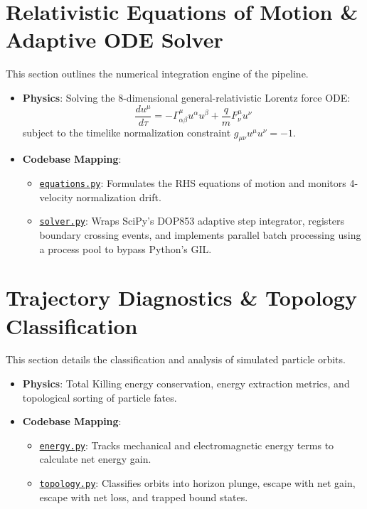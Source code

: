 \documentclass[11pt,a4paper]{article}
\begin{document}
\section{Relativistic Equations of Motion \& Adaptive ODE Solver}
This section outlines the numerical integration engine of the pipeline.
\begin{itemize}
    \item \textbf{Physics}: Solving the 8-dimensional general-relativistic Lorentz force ODE:
    \begin{equation}
        \frac{du^\mu}{d\tau} = -\Gamma^\mu_{\alpha\beta} u^\alpha u^\beta + \frac{q}{m} F^\mu_\nu u^\nu
    \end{equation}
    subject to the timelike normalization constraint $g_{\mu\nu} u^\mu u^\nu = -1$.
    \item \textbf{Codebase Mapping}:
    \begin{itemize}
        \item \href{file:///Users/vihaa/Desktop/grtp-kerr/grtp/integrator/equations.py}{\texttt{equations.py}}: Formulates the RHS equations of motion and monitors 4-velocity normalization drift.
        \item \href{file:///Users/vihaa/Desktop/grtp-kerr/grtp/integrator/solver.py}{\texttt{solver.py}}: Wraps SciPy's DOP853 adaptive step integrator, registers boundary crossing events, and implements parallel batch processing using a process pool to bypass Python's GIL.
    \end{itemize}
\end{itemize}

\section{Trajectory Diagnostics \& Topology Classification}
This section details the classification and analysis of simulated particle orbits.
\begin{itemize}
    \item \textbf{Physics}: Total Killing energy conservation, energy extraction metrics, and topological sorting of particle fates.
    \item \textbf{Codebase Mapping}:
    \begin{itemize}
        \item \href{file:///Users/vihaa/Desktop/grtp-kerr/grtp/analysis/energy.py}{\texttt{energy.py}}: Tracks mechanical and electromagnetic energy terms to calculate net energy gain.
        \item \href{file:///Users/vihaa/Desktop/grtp-kerr/grtp/analysis/topology.py}{\texttt{topology.py}}: Classifies orbits into horizon plunge, escape with net gain, escape with net loss, and trapped bound states.
    \end{itemize}
\end{itemize}
\end{document}
